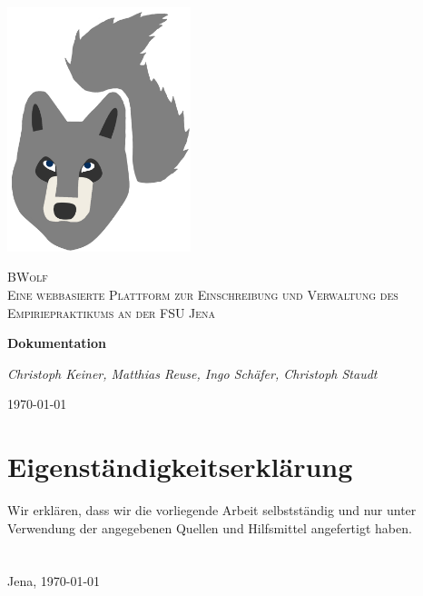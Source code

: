 \documentclass[12pt,a4paper]{report}
\begin{document}
    \onehalfspacing
    
    \begin{titlepage}
        \centering
        \includegraphics[width=0.4\textwidth]{./LogoSoFar.png}\par\vspace{1cm}
        {\scshape \LARGE BWolf \\ \Large Eine webbasierte Plattform zur
            Einschreibung und Verwaltung des
            Empiriepraktikums an der FSU Jena\par}
        \vspace{1.5cm}
        {\huge\bfseries Dokumentation\par}
        \vspace{1.5cm}
        {\large\itshape Christoph Keiner, Matthias Reuse, Ingo Schäfer, Christoph Staudt\par}
        \vspace{1.0cm}
        {\large \today\par}
    \end{titlepage}

    \section*{Eigenständigkeitserklärung}
        Wir erklären, dass wir die vorliegende Arbeit selbstständig und nur unter Verwendung der angegebenen Quellen und Hilfsmittel angefertigt haben.\\\\\\
        Jena, \today\\
        
\end{document}
